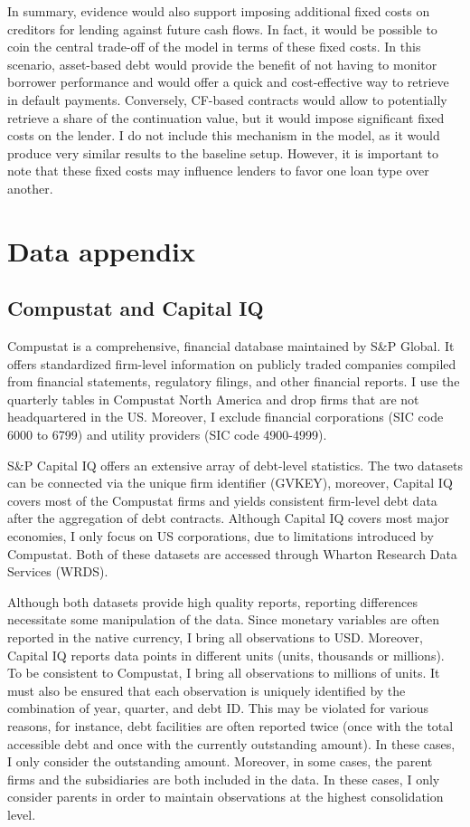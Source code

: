 \documentclass[12pt]{article}
\begin{document}
In summary, evidence would also support imposing additional fixed costs on creditors for lending against future cash flows. In fact, it would be possible to coin the central trade-off of the model in terms of these fixed costs. In this scenario, asset-based debt would provide the benefit of not having to monitor borrower performance and would offer a quick and cost-effective way to retrieve in default payments. Conversely, CF-based contracts would allow to potentially retrieve a share of the continuation value, but it would impose significant fixed costs on the lender. I do not include this mechanism in the model, as it would produce very similar results to the baseline setup. However, it is important to note that these fixed costs may influence lenders to favor one loan type over another.


\section{Data appendix \label{sec:A3}}
\subsection{Compustat and Capital IQ}
Compustat is a comprehensive, financial database maintained by S\&P Global. It offers standardized firm-level information on publicly traded companies compiled from financial statements, regulatory filings, and other financial reports. I use the quarterly tables in Compustat North America and drop firms that are not headquartered in the US. Moreover, I exclude financial corporations (SIC code 6000 to 6799) and utility providers (SIC code 4900-4999). 

S\&P Capital IQ offers an extensive array of debt-level statistics. The two datasets can be connected via the unique firm identifier (GVKEY), moreover, Capital IQ covers most of the Compustat firms and yields consistent firm-level debt data after the aggregation of debt contracts. Although Capital IQ covers most major economies, I only focus on US corporations, due to limitations introduced by Compustat. Both of these datasets are accessed through Wharton Research Data Services (WRDS). 

Although both datasets provide high quality reports, reporting differences necessitate some manipulation of the data. Since monetary variables are often reported in the native currency, I bring all observations to USD. Moreover, Capital IQ reports data points in different units (units, thousands or millions). To be consistent to Compustat, I bring all observations to millions of units. It must also be ensured that each observation is uniquely identified by the combination of year, quarter, and debt ID. This may be violated for various reasons, for instance, debt facilities are often reported twice (once with the total accessible debt and once with the currently outstanding amount). In these cases, I only consider the outstanding amount. Moreover, in some cases, the parent firms and the subsidiaries are both included in the data. In these cases, I only consider parents in order to maintain observations at the highest consolidation level. 
\end{document}
